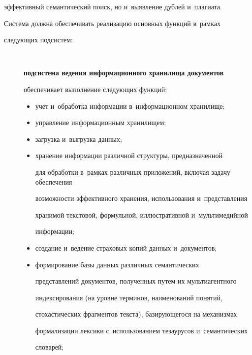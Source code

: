 эффективный семантический поиск, но и~выявление дублей и~плагиата.


     


     Система должна обеспечивать реализацию основных функций в~рамках 


следующих подсистем: 


 \begin{description}    


\item[\,]     \textbf{подсистема ведения информационного хранилища документов} 


обеспечивает выполнение следующих функций:


     \begin{itemize}


     \item  учет и~обработка информации в~информационном хранилище; 


     \item управление информационным хранилищем;


     \item загрузка и~выгрузка данных;


     \item хранение информации различной структуры, предназначенной 


для обработки в~рамках различных приложений, включая задачу обеспечения 


возможности эффективного хранения, использования и~представления 


хранимой текстовой, формульной, иллюстративной и~мультимедийной 


информации;


     \item создание и~ведение страховых копий данных и~документов;


     \item формирование базы данных различных семантических 


представлений документов, полученных путем их мультиагентного 


индексирования (на уровне терминов, наименований понятий, 


стохастических фрагментов текста), базирующегося на механизмах 


формализации лексики с~использованием  тезаурусов и~семантических 


словарей;


     \end{itemize}



\end{description}
